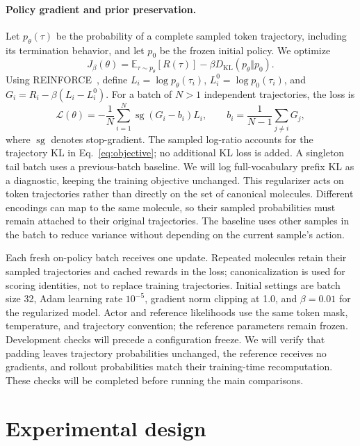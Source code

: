 \documentclass{article}
\newcommand{\KL}{D_{\mathrm{KL}}}
\newcommand{\sg}{\operatorname{sg}}
\begin{document}
\paragraph{Policy gradient and prior preservation.}
Let $p_\theta(\tau)$ be the probability of a complete sampled token trajectory,
including its termination behavior, and let $p_0$ be the frozen initial policy.
We optimize
\begin{equation}
J_\beta(\theta)=\mathbb{E}_{\tau\sim p_\theta}[R(\tau)]
 -\beta\KL\!\left(p_\theta\Vert p_0\right).
\label{eq:objective}
\end{equation}
Using REINFORCE~\citep{williams1992reinforce}, define $L_i=\log p_\theta(\tau_i)$,
$L_i^0=\log p_0(\tau_i)$, and $G_i=R_i-\beta(L_i-L_i^0)$. For a batch of $N>1$
independent trajectories, the loss is
\begin{equation}
\mathcal{L}(\theta)=-\frac{1}{N}\sum_{i=1}^{N}\sg(G_i-b_i)L_i,
\qquad b_i=\frac{1}{N-1}\sum_{j\ne i}G_j,
\label{eq:loss}
\end{equation}
where $\sg$ denotes stop-gradient. The sampled log-ratio accounts for the
trajectory KL in Eq.~\eqref{eq:objective}; no additional KL loss is added.
A singleton tail batch uses a previous-batch baseline. We will log full-vocabulary
prefix KL as a diagnostic, keeping the training objective unchanged. This regularizer acts on token
trajectories rather than directly on the set of canonical molecules. Different
encodings can map to the same molecule, so their sampled probabilities must
remain attached to their original trajectories. The baseline uses other samples
in the batch to reduce variance without depending on the current sample's action.

Each fresh on-policy batch receives one update. Repeated molecules retain their
sampled trajectories and cached rewards in the loss; canonicalization is used
for scoring identities, not to replace training trajectories. Initial settings
are batch size 32, Adam learning rate $10^{-5}$, gradient norm clipping at 1.0,
and $\beta=0.01$ for the regularized model. Actor and reference likelihoods use
the same token mask, temperature, and trajectory convention; the reference
parameters remain frozen. Development checks will precede a configuration freeze.
We will verify that padding leaves trajectory probabilities unchanged, the
reference receives no gradients, and rollout probabilities match their
training-time recomputation. These checks will be completed before running the
main comparisons.

\clearpage
\section{Experimental design}
\end{document}
